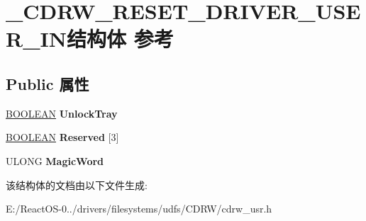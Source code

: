 \hypertarget{struct___c_d_r_w___r_e_s_e_t___d_r_i_v_e_r___u_s_e_r___i_n}{}\section{\+\_\+\+C\+D\+R\+W\+\_\+\+R\+E\+S\+E\+T\+\_\+\+D\+R\+I\+V\+E\+R\+\_\+\+U\+S\+E\+R\+\_\+\+I\+N结构体 参考}
\label{struct___c_d_r_w___r_e_s_e_t___d_r_i_v_e_r___u_s_e_r___i_n}
\subsection*{Public 属性}
\begin{DoxyCompactItemize}
\item 
\mbox{\label{struct___c_d_r_w___r_e_s_e_t___d_r_i_v_e_r___u_s_e_r___i_n_ad6626a6f5b2fe30c220255fe91f3a0e7}} 
\hyperlink{_processor_bind_8h_a112e3146cb38b6ee95e64d85842e380a}{B\+O\+O\+L\+E\+AN} {\bfseries Unlock\+Tray}
\item 
\mbox{\label{struct___c_d_r_w___r_e_s_e_t___d_r_i_v_e_r___u_s_e_r___i_n_a0de77505f84742748bdc4941ea6fcb73}} 
\hyperlink{_processor_bind_8h_a112e3146cb38b6ee95e64d85842e380a}{B\+O\+O\+L\+E\+AN} {\bfseries Reserved} \mbox{[}3\mbox{]}
\item 
\mbox{\label{struct___c_d_r_w___r_e_s_e_t___d_r_i_v_e_r___u_s_e_r___i_n_ab3a0035ed2d28f33a76b9d307d746adc}} 
U\+L\+O\+NG {\bfseries Magic\+Word}
\end{DoxyCompactItemize}


该结构体的文档由以下文件生成\+:\begin{DoxyCompactItemize}
\item 
E\+:/\+React\+O\+S-\/0../drivers/filesystems/udfs/\+C\+D\+R\+W/cdrw\+\_\+usr.\+h\end{DoxyCompactItemize}
